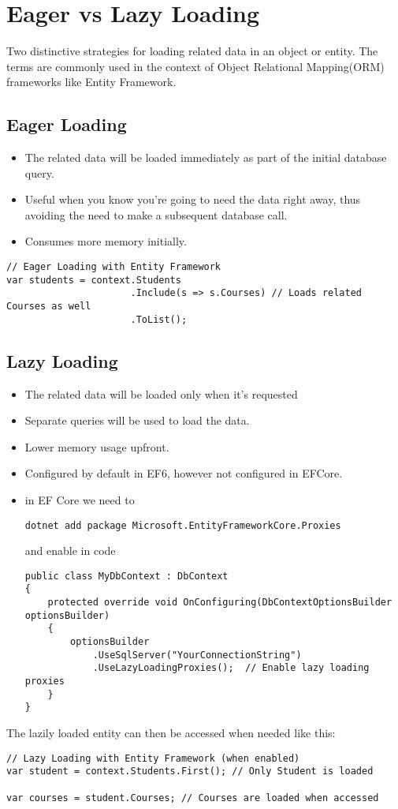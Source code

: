 


\chapter{Eager vs Lazy Loading}

Two distinctive strategies for loading related data in an object or entity. The terms are commonly used in the context of Object Relational Mapping(ORM) frameworks like Entity Framework.

\section{Eager Loading}
\begin{itemize}
\item The related data will be loaded immediately as part of the initial database query.
\item Useful when you know you're going to need the data right away, thus avoiding the need to make a subsequent database call.
\item Consumes more memory initially.
\end{itemize}

\begin{lstlisting}
// Eager Loading with Entity Framework
var students = context.Students
                      .Include(s => s.Courses) // Loads related Courses as well
                      .ToList();
\end{lstlisting}

\section{Lazy Loading}
\begin{itemize}
\item The related data will be loaded only when it's requested
\item Separate queries will be used to load the data.
\item Lower memory usage upfront.
\item Configured by default in EF6, however not configured in EFCore.
\item in EF Core we need to 
\begin{lstlisting}
dotnet add package Microsoft.EntityFrameworkCore.Proxies
\end{lstlisting}
and enable in code 
\begin{lstlisting}
public class MyDbContext : DbContext
{
    protected override void OnConfiguring(DbContextOptionsBuilder optionsBuilder)
    {
        optionsBuilder
            .UseSqlServer("YourConnectionString")
            .UseLazyLoadingProxies();  // Enable lazy loading proxies
    }
}
\end{lstlisting}
\end{itemize}

The lazily loaded entity can then be accessed when needed like this: 

\begin{lstlisting}
// Lazy Loading with Entity Framework (when enabled)
var student = context.Students.First(); // Only Student is loaded

var courses = student.Courses; // Courses are loaded when accessed
\end{lstlisting}


